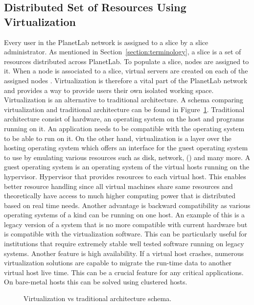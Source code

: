 \subsection{Distributed Set of Resources Using Virtualization}
\label{subsection:Virtualization}
Every user in the PlanetLab network is assigned to a slice by a slice administrator. As mentioned in Section~\ref{section:terminology}, a slice is a set of resources distributed across PlanetLab. To populate a slice, nodes are assigned to it. When a node is associated to a slice, virtual servers are created on each of the assigned nodes \cite{planetlababout}. Virtualization is therefore a vital part of the PlanetLab network and provides a way to provide users their own isolated working space.\\
Virtualization is an alternative to traditional architecture. A schema comparing virtualization and traditional architecture can be found in  Figure~\ref{fig:virtschema}. Traditional architecture consist of hardware, an operating system on the host and programs running on it. An application needs to be compatible with the operating system to be able to run on it. On the other hand, virtualization is a layer over the hosting operating system which offers an interface for the guest operating system to use by emulating various resources such as disk, network,  () and many more. A guest operating system is an operating system of the virtual hosts running on the hypervisor. Hypervisor that provides resources to each virtual host. This enables better resource handling since all virtual machines share same resources and theoretically have access to much higher computing power that is distributed based on real time needs. Another advantage is backward compatibility as various operating systems of a kind can be running on one host. An example of this is a legacy version of a system that is no more compatible with current hardware but is compatible with the virtualization software. This can be particularly useful for institutions that require extremely stable well tested software running on legacy systems. Another feature is high availability. If a virtual host crashes, numerous virtualization solutions are capable to migrate the run-time data to another virtual host live time. This can be a crucial feature for any critical applications. On bare-metal hosts this can be solved using clustered hosts.\\

\begin{figure}[H]
	\centering
	\caption{Virtualization vs traditional architecture schema.}
	\label{fig:virtschema}
\end{figure}

